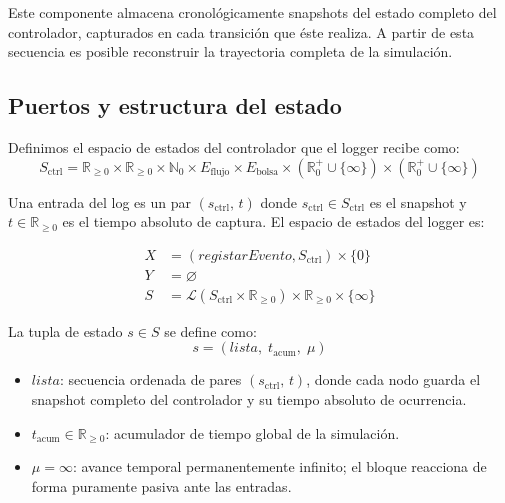 \documentclass{article}
\begin{document}
Este componente almacena cronológicamente snapshots del estado completo del
controlador, capturados en cada transición que éste realiza. A partir de esta
secuencia es posible reconstruir la trayectoria completa de la simulación.

\subsection{Puertos y estructura del estado}

Definimos el espacio de estados del controlador que el logger recibe como:
\[
  S_{\mathrm{ctrl}} = \mathbb{R}_{\ge 0}
                    \times \mathbb{R}_{\ge 0}
                    \times \mathbb{N}_0
                    \times E_{\mathrm{flujo}}
                    \times E_{\mathrm{bolsa}}
                    \times (\mathbb{R}_0^+ \cup \{\infty\})
                    \times (\mathbb{R}_0^+ \cup \{\infty\})
\]

Una entrada del log es un par $(s_{\mathrm{ctrl}},\, t)$ donde $s_{\mathrm{ctrl}}
\in S_{\mathrm{ctrl}}$ es el snapshot y $t \in \mathbb{R}_{\ge 0}$ es el tiempo
absoluto de captura. El espacio de estados del logger es:

\begin{align*}
  X &= (registarEvento, S_{\mathrm{ctrl}}) \times \{0\} \\[4pt]
  Y &= \varnothing \\[4pt]
  S &= \mathcal{L}(S_{\mathrm{ctrl}} \times \mathbb{R}_{\ge 0})
       \times \mathbb{R}_{\ge 0}
       \times \{\infty\}
\end{align*}

La tupla de estado $s \in S$ se define como:
\[
  s = (\mathit{lista},\; t_{\mathrm{acum}},\; \mu)
\]

\begin{itemize}
  \item $\mathit{lista}$: secuencia ordenada de pares $(s_{\mathrm{ctrl}},\, t)$,
        donde cada nodo guarda el snapshot completo del controlador y su tiempo
        absoluto de ocurrencia.
  \item $t_{\mathrm{acum}} \in \mathbb{R}_{\ge 0}$: acumulador de tiempo global
        de la simulación.
  \item $\mu = \infty$: avance temporal permanentemente infinito; el bloque
        reacciona de forma puramente pasiva ante las entradas.
\end{itemize}
\end{document}
